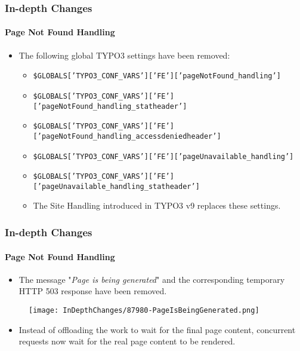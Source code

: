 \begin{frame}[fragile]
	\frametitle{In-depth Changes}
	\framesubtitle{Page Not Found Handling}

	\begin{itemize}

		\item The following global TYPO3 settings have been removed:

			\begin{itemize}
				\item {\fontsize{7}{8}\selectfont\texttt{\$GLOBALS['TYPO3\_CONF\_VARS']['FE']['pageNotFound\_handling']}}
				\item {\fontsize{7}{8}\selectfont\texttt{\$GLOBALS['TYPO3\_CONF\_VARS']['FE']['pageNotFound\_handling\_statheader']}}
				\item {\fontsize{7}{8}\selectfont\texttt{\$GLOBALS['TYPO3\_CONF\_VARS']['FE']['pageNotFound\_handling\_accessdeniedheader']}}
				\item {\fontsize{7}{8}\selectfont\texttt{\$GLOBALS['TYPO3\_CONF\_VARS']['FE']['pageUnavailable\_handling']}}
				\item {\fontsize{7}{8}\selectfont\texttt{\$GLOBALS['TYPO3\_CONF\_VARS']['FE']['pageUnavailable\_handling\_statheader']}}
			\end{itemize}

			\begin{itemize}\smaller
				\item[\ding{228}] The Site Handling introduced in TYPO3 v9 replaces these settings.
			\end{itemize}\normalsize

	\end{itemize}

\end{frame}


\begin{frame}[fragile]
	\frametitle{In-depth Changes}
	\framesubtitle{Page Not Found Handling}

	\begin{itemize}

		\item The message "\textit{Page is being generated}" and the corresponding temporary
			HTTP 503 response have been removed.
	\end{itemize}

	\begin{figure}
		\texttt{[image: InDepthChanges/87980-PageIsBeingGenerated.png]}
	\end{figure}

	\begin{itemize}
		\item Instead of offloading the work to wait for the final page content, concurrent
			requests now wait for the real page content to be rendered.
	\end{itemize}

\end{frame}

